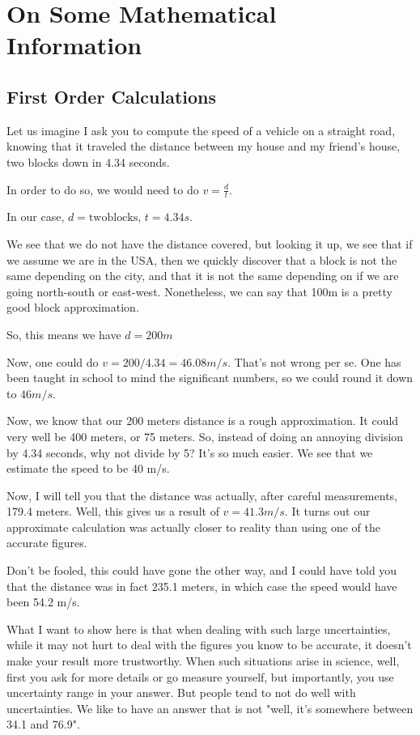 
\chapter{On Some Mathematical Information}

\section{First Order Calculations}

Let us imagine I ask you to compute the speed of a vehicle on a straight road, knowing that it traveled the distance between my house and my friend's house, two blocks down in 4.34 seconds.

In order to do so, we would need to do $v = \frac{d}{t}$.

In our case, $d = \mathrm{two blocks}$, $t = 4.34s$.

We see that we do not have the distance covered, but looking it up, we see that if we assume we are in the USA, then we quickly discover that a block is not the same depending on the city, and that it is not the same depending on if we are going north-south or east-west. Nonetheless, we can say that 100m is a pretty good block approximation.

So, this means we have $d = 200m$

Now, one could do $v = {200}/{4.34} = 46.08 m/s$. That's not wrong per se. One has been taught in school to mind the significant numbers, so we could round it down to $46 m/s$.

Now, we know that our 200 meters distance is a rough approximation. It could very well be 400 meters, or 75 meters. So, instead of doing an annoying division by 4.34 seconds, why not divide by 5? It's so much easier. We see that we estimate the speed to be 40 m/s.

Now, I will tell you that the distance was actually, after careful measurements, 179.4 meters. Well, this gives us a result of $v = 41.3 m/s$. It turns out our approximate calculation was actually closer to reality than using one of the accurate figures.

Don't be fooled, this could have gone the other way, and I could have told you that the distance was in fact 235.1 meters, in which case the speed would have been 54.2 m/s.

What I want to show here is that when dealing with such large uncertainties, while it may not hurt to deal with the figures you know to be accurate, it doesn't make your result more trustworthy. When such situations arise in science, well, first you ask for more details or go measure yourself, but importantly, you use uncertainty range in your answer. But people tend to not do well with uncertainties. We like to have an answer that is not "well, it's somewhere between 34.1 and 76.9".

